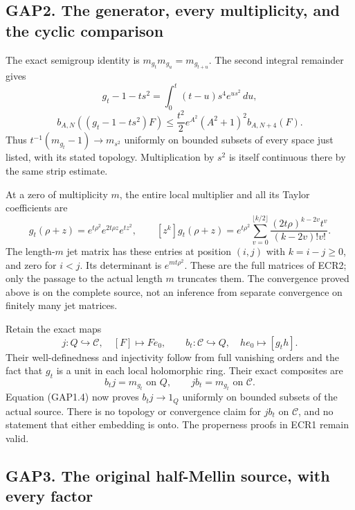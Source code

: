 \subsection{GAP2. The generator, every multiplicity, and the cyclic
comparison}\label{gap2.-the-generator-every-multiplicity-and-the-cyclic-comparison}

The exact semigroup identity is \(m_{g_t}m_{g_u}=m_{g_{t+u}}\). The
second integral remainder gives \[
g_t-1-ts^2=\int_0^t(t-u)s^4e^{us^2}\,du,
\] \[
b_{A,N}((g_t-1-ts^2)F)
\le\frac{t^2}{2}e^{A^2}(A^2+1)^2b_{A,N+4}(F).
\tag{GAP2.1}
\] Thus \(t^{-1}(m_{g_t}-1)\to m_{s^2}\) uniformly on bounded subsets of
every space just listed, with its stated topology. Multiplication by
\(s^2\) is itself continuous there by the same strip estimate.

At a zero of multiplicity \(m\), the entire local multiplier and all its
Taylor coefficients are \[
g_t(\rho+z)=e^{t\rho^2}e^{2t\rho z}e^{tz^2},\qquad
[z^k]g_t(\rho+z)=e^{t\rho^2}
\sum_{v=0}^{\lfloor k/2\rfloor}
\frac{(2t\rho)^{k-2v}t^v}{(k-2v)!v!}.
\tag{GAP2.2}
\] The length-\(m\) jet matrix has these entries at position \((i,j)\)
with \(k=i-j\ge0\), and zero for \(i<j\). Its determinant is
\(e^{mt\rho^2}\). These are the full matrices of ECR2; only the passage
to the actual length \(m\) truncates them. The convergence proved above
is on the complete source, not an inference from separate convergence on
finitely many jet matrices.

Retain the exact maps \[
j:Q\hookrightarrow\mathscr C,\quad [F]\mapsto F e_0,
\qquad b_t:\mathscr C\hookrightarrow Q,\quad h e_0\mapsto[g_th].
\] Their well-definedness and injectivity follow from full vanishing
orders and the fact that \(g_t\) is a unit in each local holomorphic
ring. Their exact composites are \[
b_tj=m_{g_t}\text{ on }Q,\qquad jb_t=m_{g_t}\text{ on }\mathscr C.
\tag{GAP2.3}
\] Equation (GAP1.4) now proves \(b_tj\to1_Q\) uniformly on bounded
subsets of the actual source. There is no topology or convergence claim
for \(jb_t\) on \(\mathscr C\), and no statement that either embedding
is onto. The properness proofs in ECR1 remain valid.

\subsection{GAP3. The original half-Mellin source, with every
factor}\label{gap3.-the-original-half-mellin-source-with-every-factor}

